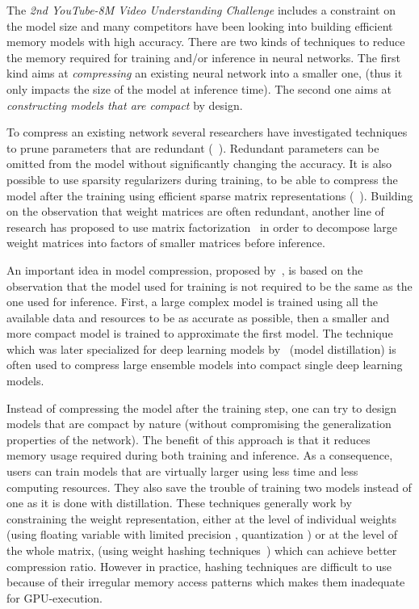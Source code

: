 The \emph{2nd YouTube-8M Video Understanding Challenge} includes a constraint on the model size and many competitors have been looking into building efficient memory models with high accuracy.
There are two kinds of techniques to reduce the memory required for training and/or inference in neural networks.
The first kind aims at \emph{compressing} an existing neural network into a smaller one, (thus it only impacts the size of the model at inference time).
The second one aims at \emph{constructing models that are compact} by design. 

To compress an existing network several researchers have investigated techniques to prune parameters that are redundant (\eg ~\cite{pmlr-v80-dai18d,han2015deep_compression,NIPS2017_6813}).
Redundant parameters can be omitted from the model without significantly changing the accuracy.
It is also possible to use sparsity regularizers during training, to be able to compress the model after the training using efficient sparse matrix representations (\eg~\cite{Collins2014MemoryBD,pmlr-v80-dai18d,7298681}).
Building on the observation that weight matrices are often redundant, another line of research has proposed to use matrix factorization~\cite{NIPS2013_5025,Jaderberg2014SpeedingUC,8099498} in order to decompose large weight matrices into factors of smaller matrices before inference.

An important idea in model compression, proposed by~\citet{bucilua2006model}, is based on the observation that the model used for training is not required to be the same as the one used for inference.
First, a large complex model is trained using all the available data and resources  to be as accurate as possible, then a smaller and more compact model is trained to approximate the first model.
The technique which was later specialized for deep learning models by~\citet{44873} (\aka model distillation) is often used to compress large ensemble models into compact single deep learning models.

Instead of compressing the model after the training step, one can try to design models that are compact by nature (without compromising the generalization properties of the network).
The benefit of this approach is that it reduces memory usage required during both training and inference.
As a consequence, users can train models that are virtually larger using less time and less computing resources.
They also save the trouble of training two models instead of one as it is done with distillation.
These techniques generally work by constraining the weight representation, either at the level of individual weights (\eg using floating variable with limited precision \cite{Gupta:2015:DLL:3045118.3045303}, quantization \cite{Courbariaux:2015:BTD:2969442.2969588,DBLP:journals/corr/MellempudiKM0KD17,rastegariECCV16}) or  at the level of the whole matrix, (\eg using weight hashing techniques~\cite{Chen:2015:CNN:3045118.3045361}) which can achieve better compression ratio.
However in practice, hashing techniques are difficult to use because of their irregular memory access patterns which makes them inadequate for GPU-execution.

